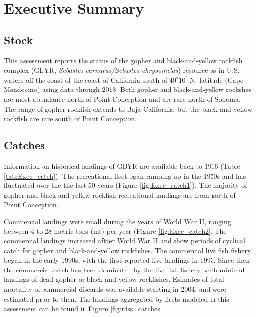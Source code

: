 \documentclass[12pt,]{article}
\begin{document}
{
\setcounter{tocdepth}{4}
\tableofcontents
}
\setlength{\parskip}{5mm plus1mm minus1mm} \pagebreak

\setcounter{page}{1} \renewcommand{\thefigure}{\alph{figure}}
\renewcommand{\thetable}{\alph{table}}

\section*{Executive Summary}\label{executive-summary}

\subsection*{Stock}\label{stock}

This assessment reports the status of the gopher and black-and-yellow
rockfish\\
complex (GBYR, \emph{Sebastes carnatus/Sebastes chrysomelas}) resource
as in U.S. waters off the coast of the coast of California south of
\(40^\circ 10^\prime\) N. latitude (Cape Mendocino) using data through
2018. Both gopher and black-and-yellow rockshes are most abundance north
of Point Conception and are rare north of Sonoma. The range of gopher
rockfish extends to Baja California, but the black-and-yellow rockfish
are rare south of Point Conception.

\subsection*{Catches}\label{catches}

Information on historical landings of GBYR are available back to 1916
(Table \ref{tab:Exec_catch}). The recreational fleet bgan ramping up in
the 1950s and has fluctuated over the the last 50 years (Figure
\ref{fig:Exec_catch1}). The majority of gopher and black-and-yellow
rockfish recreational landings are from north of Point Conception.

Commercial landings were small during the years of World War II, ranging
between 4 to 28 metric tons (mt) per year (Figure \ref{fig:Exec_catch2}.
The commercial landings increased aftter World War II and show periods
of cyclical catch for gopher and black-and-yellow rockfishes. The
commercial live fish fishery began in the early 1990s, with the first
reported live landings in 1993. Since then the commercial catch has been
dominated by the live fish fishery, with minimal landings of dead gopher
or black-and-yellow rockfishes. Esimates of total mortality of
commercial discards was available starting in 2004, and were estimated
prior to then. The landings aggregated by fleets modeled in this
assessment can be found in Figure \ref{fig:r4ss_catches}.
\end{document}
